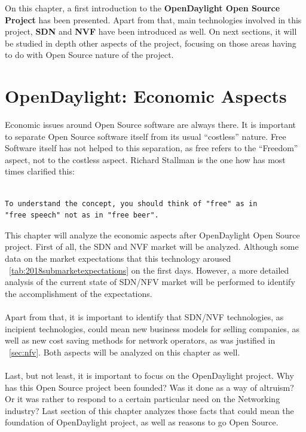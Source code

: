 \documentclass[a4paper, 12pt]{book}
\begin{document}
On this chapter, a first introduction to the \textbf{OpenDaylight Open Source Project} has been presented. Apart from that, main technologies involved in this project, \textbf{SDN} and \textbf{NVF} have been introduced as well. On next sections, it will be studied in depth other aspects of the project, focusing on those areas having to do with Open Source nature of the project.

\chapter{OpenDaylight: Economic Aspects}
\label{chap:odleconomic}

Economic issues around Open Source software are always there. It is important to separate Open Source software itself from its usual ``costless'' nature. Free Software itself has not helped to this separation, as free refers to the ``Freedom'' aspect, not to the costless aspect. Richard Stallman is the one how has most times clarified this:
\begin{verbatim}

To understand the concept, you should think of "free" as in
"free speech" not as in "free beer".

\end{verbatim}
This chapter will analyze the economic aspects after OpenDaylight Open Source project. First of all, the SDN and NVF market will be analyzed. Although some data on the market expectations that this technology aroused ~\ref{tab:2018submarketexpectations} on the first days. However, a more detailed analysis of the current state of SDN/NFV market will be performed to identify the accomplishment of the expectations.\\
\\
Apart from that, it is important to identify that SDN/NVF technologies, as incipient technologies, could mean new business models for selling companies, as well as new cost saving methods for network operators, as was justified in ~\ref{sec:nfv}. Both aspects will be analyzed on this chapter as well.\\
\\
Last, but not least, it is important to focus on the OpenDaylight project. Why has this Open Source project been founded? Was it done as a way of altruism? Or it was rather to respond to a certain particular need on the Networking industry? Last section of this chapter analyzes those facts that could mean the foundation of OpenDaylight project, as well as reasons to go Open Source.
\end{document}
